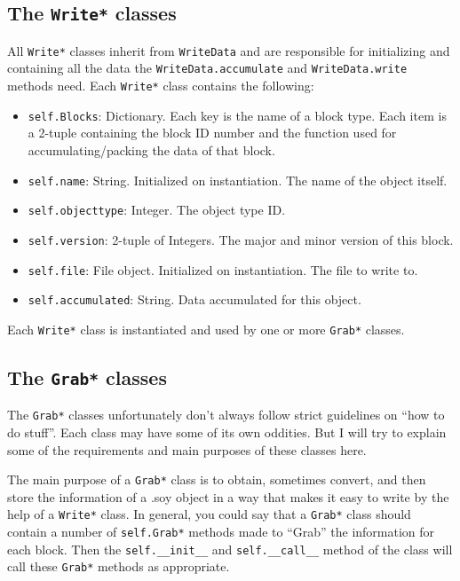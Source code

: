 \subsection*{The \texttt{Write*} classes}
All \texttt{Write*} classes inherit from \texttt{WriteData} and are responsible for initializing and containing all the data the \texttt{WriteData.accumulate} and \texttt{WriteData.write} methods need. Each \texttt{Write*} class contains the following:

\begin{itemize}
\item \texttt{self.Blocks}: Dictionary. Each key is the name of a block type. Each item is a 2-tuple containing the block ID number and the function used for accumulating/packing the data of that block.
\item \texttt{self.name}: String. Initialized on instantiation. The name of the object itself.
\item \texttt{self.objecttype}: Integer. The object type ID.
\item \texttt{self.version}: 2-tuple of Integers. The major and minor version of this block.
\item \texttt{self.file}: File object. Initialized on instantiation. The file to write to.
\item \texttt{self.accumulated}: String. Data accumulated for this object.
\end{itemize}

Each \texttt{Write*} class is instantiated and used by one or more \texttt{Grab*} classes.

\subsection*{The \texttt{Grab*} classes}
The \texttt{Grab*} classes unfortunately don't always follow strict guidelines on ``how to do stuff''. Each class may have some of its own oddities. But I will try to explain some of the requirements and main purposes of these classes here.

The main purpose of a \texttt{Grab*} class is to obtain, sometimes convert, and then store the information of a .soy object in a way that makes it easy to write by the help of a \texttt{Write*} class. In general, you could say that a \texttt{Grab*} class should contain a number of \texttt{self.Grab*} methods made to ``Grab'' the information for each block. Then the \texttt{self.\_\_init\_\_} and \texttt{self.\_\_call\_\_} method of the class will call these \texttt{Grab*} methods as appropriate.

